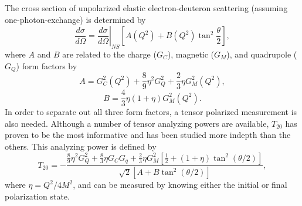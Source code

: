 
The cross section of unpolarized elastic electron-deuteron scattering (assuming one-photon-exchange) is determined by
\begin{equation}
\frac{d\sigma}{d\Omega} = \left. \frac{d\sigma}{d\Omega}\right\vert_{NS}\left[A(Q^2)  + B(Q^2)\tan^2\frac{\theta}{2}  \right],
\end{equation}
where $A$ and $B$ are related to the charge ($G_C$), magnetic ($G_M$), and quadrupole ($G_Q$) form factors by
\begin{equation}
A=G_C^2(Q^2)+\frac{8}{9} \eta ^2 G_Q^2 + \frac{2}{3} \eta G_M^2(Q^2),
\end{equation}
\begin{equation}
B=\frac{4}{3}\eta (1+\eta )G_M^2(Q^2).
\end{equation}
In order to separate out all three form factors, a tensor polarized measurement is also needed. Although a number of tensor analyzing powers are available, $T_{20}$ has proven to be the most informative and has been studied more indepth than the others. This analyzing power is defined by
\begin{equation}
T_{20} = -\frac{\frac{8}{9}\eta^2 G^2_Q + \frac{8}{3} \eta G_C G_q + \frac{2}{3} \eta G_M^2\left[\frac{1}{2} + (1 + \eta) \tan^2(\theta / 2) \right]}{\sqrt{2} [A + B\tan^2(\theta / 2)]},
\end{equation}
where $\eta=Q^2/4M^2$, and can be measured by knowing either the initial or final polarization state.



